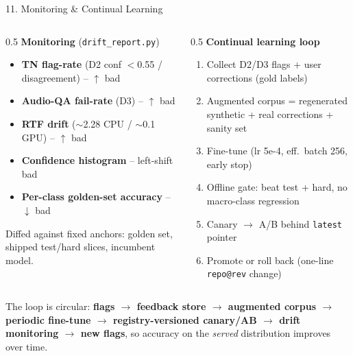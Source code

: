 \documentclass[10pt,aspectratio=169]{beamer}
\begin{document}
\begin{frame}{11. Monitoring \& Continual Learning}
\begin{columns}[T]
\begin{column}{0.5\textwidth}
\textbf{Monitoring} (\texttt{drift\_report.py})
\begin{itemize}\small
  \item \textbf{TN flag-rate} (D2 conf $<$0.55 / disagreement) -- $\uparrow$ bad
  \item \textbf{Audio-QA fail-rate} (D3) -- $\uparrow$ bad
  \item \textbf{RTF drift} ($\sim$2.28 CPU / $\sim$0.1 GPU) -- $\uparrow$ bad
  \item \textbf{Confidence histogram} -- left-shift bad
  \item \textbf{Per-class golden-set accuracy} -- $\downarrow$ bad
\end{itemize}
\scriptsize Diffed against fixed anchors: golden set, shipped test/hard slices, incumbent model.
\end{column}
\begin{column}{0.5\textwidth}
\textbf{Continual learning loop}
\begin{enumerate}\small
  \item Collect D2/D3 flags + user corrections (gold labels)
  \item Augmented corpus = regenerated synthetic + real corrections + sanity set
  \item Fine-tune (lr 5e-4, eff.\ batch 256, early stop)
  \item Offline gate: beat test + hard, no macro-class regression
  \item Canary $\rightarrow$ A/B behind \texttt{latest} pointer
  \item Promote or roll back (one-line \texttt{repo@rev} change)
\end{enumerate}
\end{column}
\end{columns}

\vspace{0.15cm}
\centering
\scriptsize The loop is circular: \textbf{flags $\rightarrow$ feedback store $\rightarrow$ augmented corpus $\rightarrow$ periodic fine-tune $\rightarrow$ registry-versioned canary/AB $\rightarrow$ drift monitoring $\rightarrow$ new flags}, so accuracy on the \emph{served} distribution improves over time.
\end{frame}
\end{document}
